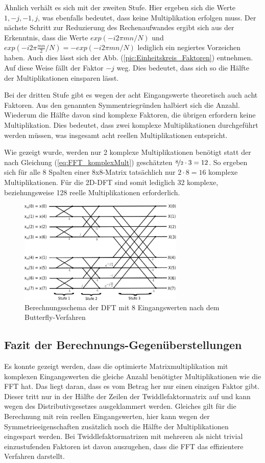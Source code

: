 Ähnlich verhält es sich mit der zweiten Stufe.
Hier ergeben sich die Werte $1, -j, -1, j$, was ebenfalls bedeutet, dass keine Multiplikation erfolgen muss. Der nächste Schritt zur Reduzierung des Rechenaufwandes ergibt sich
aus der Erkenntnis, dass die Werte $exp(-i 2 \pi m n/N)$ und $exp(-i 2 \pi \frac{m n}{2}/N) = -exp(-i 2 \pi m n/N)$ lediglich ein negiertes Vorzeichen haben. Auch dies lässt sich der 
Abb. (\ref{pic:Einheitskreis_Faktoren}) entnehmen. Auf diese Weise fällt der Faktor $-j$ weg. Dies bedeutet, dass sich so die Hälfte der Multiplikationen einsparen lässt.

Bei der dritten Stufe gibt es wegen der acht Eingangswerte theoretisch auch acht Faktoren. Aus den genannten Symmentriegründen halbiert sich die Anzahl. Wiederum die Hälfte davon 
sind komplexe Faktoren, die übrigen erfordern keine Multiplikation. Dies bedeutet, dass zwei komplexe Multiplikationen durchgeführt werden müssen, was insgesamt acht reellen 
Multiplikationen entspricht. 

Wie gezeigt wurde, werden nur 2 komplexe Multiplikationen benötigt statt der nach Gleichung (\ref{eq:FFT_komplexMult}) geschätzten $\nicefrac{8}{2}\cdot 3 = 12$.
So ergeben sich für alle 8 Spalten einer 8x8-Matrix tatsächlich nur $2\cdot8=16$ komplexe Multiplikationen. 
Für die 2D-DFT sind somit lediglich 32 komplexe, beziehungsweise 128 reelle Multiplikationen erforderlich.



\begin{figure}[htbp]
 \centering
 \includegraphics[width=0.7\textwidth]{img/Butterfly.png}
 \caption{Berechnungsschema der DFT mit 8 Eingangswerten nach dem Butterfly-Verfahren}
 \label{pic:Butterfly}
\end{figure}


\subsection{Fazit der Berechnungs-Gegenüberstellungen}
Es konnte gezeigt werden, dass die optimierte Matrixmultiplikation mit komplexen Eingangswerten die gleiche Anzahl benötigter Multiplikationen wie die FFT hat.
Das liegt daran, dass es vom Betrag her nur einen einzigen Faktor gibt. Dieser tritt nur in der Hälfte der Zeilen der Twiddlefaktormatrix auf und kann wegen des Distributivgesetzes
ausgeklammert werden. Gleiches gilt für die Berechnung mit rein reellen Eingangswerten, hier kann wegen der Symmetrieeigenschaften zusätzlich noch die Hälfte der
Multiplikationen eingespart werden.
Bei Twiddlefaktormatrizen mit mehreren als nicht trivial einzustufenden Faktoren ist davon auszugehen, dass die FFT das effizientere Verfahren darstellt. 

